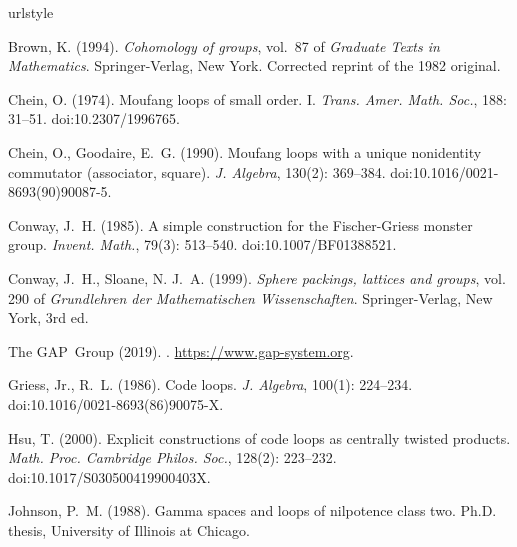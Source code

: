 \documentclass{article}
\theoremstyle{plain}
\theoremstyle{definition}
\begin{document}
% 
% 

\begin{thebibliography}{10}
\expandafter\ifx\csname urlstyle\endcsname\relax
 \providecommand{\doi}[1]{doi:\discretionary{}{}{}#1}\else
 \providecommand{\doi}{doi:\discretionary{}{}{}\begingroup
  \urlstyle{rm}\Url}\fi

Brown, K. (1994).
\newblock \emph{Cohomology of groups}, vol.~87 of \emph{Graduate Texts in
  Mathematics}.
\newblock Springer-Verlag, New York.
\newblock Corrected reprint of the 1982 original.

Chein, O. (1974).
\newblock Moufang loops of small order. {I}.
\newblock \emph{Trans. Amer. Math. Soc.}, 188: 31--51.
\newblock \doi{10.2307/1996765}.

Chein, O., Goodaire, E.~G. (1990).
\newblock Moufang loops with a unique nonidentity commutator (associator,
  square).
\newblock \emph{J. Algebra}, 130(2): 369--384.
\newblock \doi{10.1016/0021-8693(90)90087-5}.

Conway, J.~H. (1985).
\newblock A simple construction for the {F}ischer-{G}riess monster group.
\newblock \emph{Invent. Math.}, 79(3): 513--540.
\newblock \doi{10.1007/BF01388521}.

Conway, J.~H., Sloane, N. J.~A. (1999).
\newblock \emph{Sphere packings, lattices and groups}, vol. 290 of
  \emph{Grundlehren der Mathematischen Wissenschaften}.
\newblock Springer-Verlag, New York, 3rd ed.

The GAP~Group (2019).
. 
\newblock \url{https://www.gap-system.org}.

Griess, Jr., R.~L. (1986).
\newblock Code loops.
\newblock \emph{J. Algebra}, 100(1): 224--234.
\newblock \doi{10.1016/0021-8693(86)90075-X}.

Hsu, T. (2000).
\newblock Explicit constructions of code loops as centrally twisted products.
\newblock \emph{Math. Proc. Cambridge Philos. Soc.}, 128(2): 223--232.
\newblock \doi{10.1017/S030500419900403X}.

Johnson, P.~M. (1988).
\newblock Gamma spaces and loops of nilpotence class two.
\newblock Ph.D. thesis, University of Illinois at Chicago.



\end{thebibliography}
\end{document}
